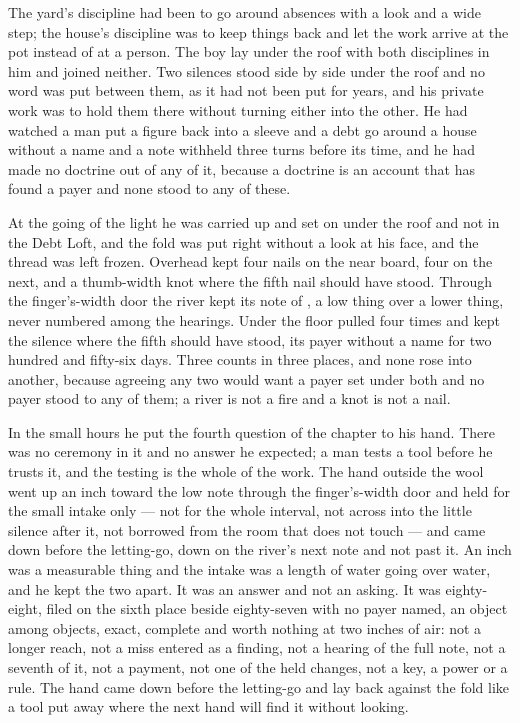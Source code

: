 The yard's discipline had been to go around absences with a look and a wide step; the house's discipline was to keep things back and let the work arrive at the pot instead of at a person. The boy lay under the roof with both disciplines in him and joined neither. Two silences stood side by side under the roof and no word was put between them, as it had not been put for years, and his private work was to hold them there without turning either into the other. He had watched a man put a figure back into a sleeve and a debt go around a house without a name and a note withheld three turns before its time, and he had made no doctrine out of any of it, because a doctrine is an account that has found a payer and none stood to any of these.

At the going of the light he was carried up  and set on  under the roof and not in the Debt Loft, and the fold was put right without a look at his face, and the thread was left frozen. Overhead  kept four nails on the near board, four on the next, and a thumb-width knot where the fifth nail should have stood. Through the finger's-width door the river kept its note of , a low thing over a lower thing, never numbered among the hearings. Under the floor  pulled four times and kept the silence where the fifth should have stood, its payer without a name for two hundred and fifty-six days. Three counts in three places, and none rose into another, because agreeing any two would want a payer set under both and no payer stood to any of them; a river is not a fire and a knot is not a nail.

In the small hours he put the fourth question of the chapter to his hand. There was no ceremony in it and no answer he expected; a man tests a tool before he trusts it, and the testing is the whole of the work. The hand outside the wool went up an inch toward the low note through the finger's-width door and held for the small intake only --- not for the whole interval, not across into the little silence after it, not borrowed from the room that does not touch --- and came down before the letting-go, down on the river's next note and not past it. An inch was a measurable thing and the intake was a length of water going over water, and he kept the two apart. It was an answer and not an asking. It was eighty-eight, filed on the sixth place beside eighty-seven with no payer named, an object among objects, exact, complete and worth nothing at two inches of air: not a longer reach, not a miss entered as a finding, not a hearing of the full note, not a seventh of it, not a payment, not one of the held changes, not a key, a power or a rule. The hand came down before the letting-go and lay back against the fold like a tool put away where the next hand will find it without looking.

